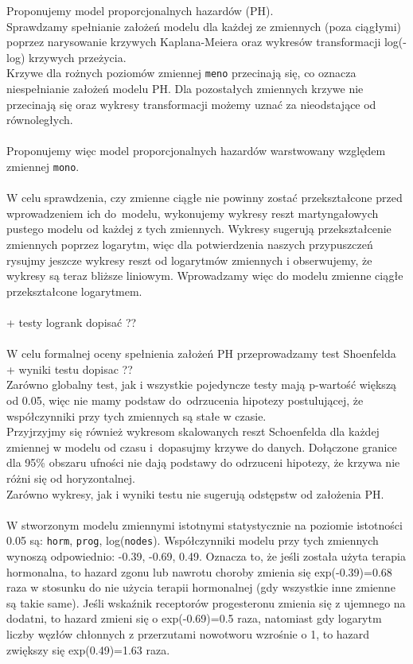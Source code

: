 \documentclass[10pt]{article}
\begin{document}
Proponujemy model proporcjonalnych hazardów (PH). \\
Sprawdzamy spełnianie założeń modelu dla każdej ze zmiennych (poza ciągłymi) poprzez narysowanie krzywych Kaplana-Meiera oraz wykresów transformacji log(-log) krzywych przeżycia. \\
Krzywe dla rożnych poziomów zmiennej \texttt{meno} przecinają się, co oznacza niespełnianie założeń modelu PH.
Dla pozostałych zmiennych krzywe nie przecinają się oraz wykresy transformacji możemy uznać za nieodstające od równoległych. \\\\
Proponujemy więc model proporcjonalnych hazardów warstwowany względem zmiennej \texttt{mono}. \\\\
W celu sprawdzenia, czy zmienne ciągłe nie powinny zostać przekształcone przed wprowadzeniem ich do~modelu, wykonujemy wykresy reszt martyngałowych pustego modelu od każdej z tych zmiennych. Wykresy sugerują przekształcenie zmiennych poprzez logarytm, więc dla potwierdzenia naszych przypuszczeń rysujmy jeszcze wykresy reszt od logarytmów zmiennych i obserwujemy, że wykresy są teraz bliższe liniowym. Wprowadzamy więc do modelu zmienne ciągłe przekształcone logarytmem.  \\\\
+ testy logrank dopisać ?? \\\\
W celu formalnej oceny spełnienia założeń PH przeprowadzamy test Shoenfelda \\
+ wyniki testu dopisac ?? \\
Zarówno globalny test, jak i wszystkie pojedyncze testy mają p-wartość większą od 0.05, więc nie mamy podstaw do~odrzucenia hipotezy postulującej, że współczynniki przy tych zmiennych są stałe w czasie.  \\
Przyjrzyjmy się również wykresom skalowanych reszt Schoenfelda dla każdej zmiennej w modelu od czasu i~dopasujmy krzywe do danych. Dołączone granice dla 95\% obszaru ufności nie dają podstawy do odrzuceni hipotezy, że krzywa nie różni się od horyzontalnej.  \\
Zarówno wykresy, jak i wyniki testu nie sugerują odstępstw od założenia PH. \\\\
W stworzonym modelu zmiennymi istotnymi statystycznie na poziomie istotności 0.05 są: \texttt{horm}, \texttt{prog}, log(\texttt{nodes}). Współczynniki modelu przy tych zmiennych wynoszą odpowiednio: -0.39, -0.69, 0.49. Oznacza to, że jeśli została użyta terapia hormonalna, to hazard zgonu lub nawrotu choroby zmienia się exp(-0.39)=0.68 raza w stosunku do nie użycia terapii hormonalnej (gdy wszystkie inne zmienne są takie same). Jeśli wskaźnik receptorów progesteronu zmienia się z ujemnego na dodatni, to hazard zmieni się o exp(-0.69)=0.5 raza, natomiast gdy logarytm liczby węzłów chłonnych z przerzutami nowotworu wzrośnie o 1, to hazard zwiększy się exp(0.49)=1.63 raza. \\\\
\end{document}
